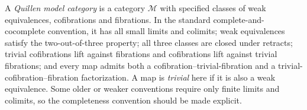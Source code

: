 
A \emph{Quillen model category} is a category $\mathcal M$ with specified classes of weak equivalences, cofibrations and fibrations. In the standard complete-and-cocomplete convention, it has all small limits and colimits; weak equivalences satisfy the two-out-of-three property; all three classes are closed under retracts; trivial cofibrations lift against fibrations and cofibrations lift against trivial fibrations; and every map admits both a cofibration--trivial-fibration and a trivial-cofibration--fibration factorization. A map is \emph{trivial} here if it is also a weak equivalence. Some older or weaker conventions require only finite limits and colimits, so the completeness convention should be made explicit.
